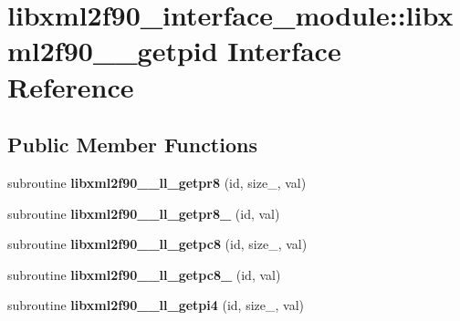 \hypertarget{interfacelibxml2f90__interface__module_1_1libxml2f90____getpid}{
\section{libxml2f90\_\-interface\_\-module::libxml2f90\_\-\_\-getpid Interface Reference}
\label{interfacelibxml2f90__interface__module_1_1libxml2f90____getpid}
}
\subsection*{Public Member Functions}
\begin{DoxyCompactItemize}
\item 
\hypertarget{interfacelibxml2f90__interface__module_1_1libxml2f90____getpid_af474b6255026bbfa4b963fc19747c9aa}{
subroutine {\bfseries libxml2f90\_\-\_\-ll\_\-getpr8} (id, size\_\-, val)}
\label{interfacelibxml2f90__interface__module_1_1libxml2f90____getpid_af474b6255026bbfa4b963fc19747c9aa}

\item 
\hypertarget{interfacelibxml2f90__interface__module_1_1libxml2f90____getpid_a3dbeb5a3b2d86deea3579d7f6d93477e}{
subroutine {\bfseries libxml2f90\_\-\_\-ll\_\-getpr8\_\-} (id, val)}
\label{interfacelibxml2f90__interface__module_1_1libxml2f90____getpid_a3dbeb5a3b2d86deea3579d7f6d93477e}

\item 
\hypertarget{interfacelibxml2f90__interface__module_1_1libxml2f90____getpid_a3a871a325c073963ca30129eaede902c}{
subroutine {\bfseries libxml2f90\_\-\_\-ll\_\-getpc8} (id, size\_\-, val)}
\label{interfacelibxml2f90__interface__module_1_1libxml2f90____getpid_a3a871a325c073963ca30129eaede902c}

\item 
\hypertarget{interfacelibxml2f90__interface__module_1_1libxml2f90____getpid_a3d468e8c1914f323a909681e19c25d58}{
subroutine {\bfseries libxml2f90\_\-\_\-ll\_\-getpc8\_\-} (id, val)}
\label{interfacelibxml2f90__interface__module_1_1libxml2f90____getpid_a3d468e8c1914f323a909681e19c25d58}

\item 
\hypertarget{interfacelibxml2f90__interface__module_1_1libxml2f90____getpid_a85aca6d7ce7d8055d238d1f0b1174458}{
subroutine {\bfseries libxml2f90\_\-\_\-ll\_\-getpi4} (id, size\_\-, val)}
\label{interfacelibxml2f90__interface__module_1_1libxml2f90____getpid_a85aca6d7ce7d8055d238d1f0b1174458}


\end{DoxyCompactItemize}
